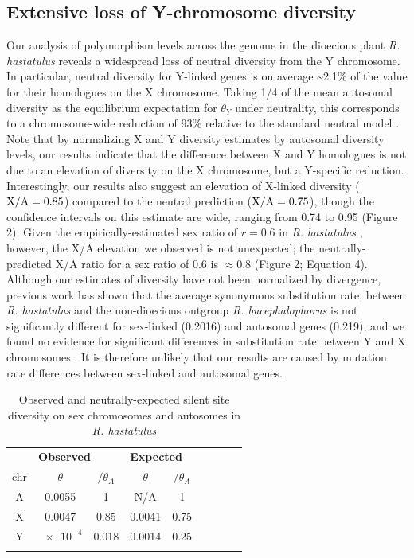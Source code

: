 \documentclass[9pt,twocolumn,twoside]{gsajnl}
\begin{document}
\subsection*{Extensive loss of Y-chromosome diversity}
Our analysis of polymorphism levels across the genome in the dioecious plant \textit{R. hastatulus} reveals a widespread loss of neutral diversity from the Y chromosome. In particular, neutral diversity for Y-linked genes is on average \textasciitilde 2.1\% of the value for their homologues on the X chromosome. Taking 1/4 of the mean autosomal diversity as the equilibrium expectation for $\theta_{Y}$ under neutrality, this corresponds to a chromosome-wide reduction of 93\% relative to the standard neutral model \citep{wright1931evolution}. Note that by normalizing X and Y diversity estimates by autosomal diversity levels, our results indicate that the difference between X and Y homologues is not due to an elevation of diversity on the X chromosome, but a Y-specific reduction. Interestingly, our results also suggest an elevation of X-linked diversity ($\textnormal{X/A}=0.85$) compared to the neutral prediction ($\textnormal{X/A}=0.75$), though the confidence intervals on this estimate are wide, ranging from 0.74 to 0.95 (Figure 2). Given the empirically-estimated sex ratio of $r=0.6$ in \textit{R. hastatulus} \citep{pickup2013influence}, however, the X/A elevation we observed is not unexpected; the neutrally-predicted X/A ratio for a sex ratio of 0.6 is $\approx 0.8$ (Figure 2; Equation 4). Although our estimates of diversity have not been normalized by divergence, previous work has shown that the average synonymous substitution rate, between \textit{R. hastatulus} and the non-dioecious outgroup \textit{R. bucephalophorus} is not significantly different for sex-linked (0.2016) and autosomal genes (0.219), and we found no evidence for significant differences in substitution rate between Y and X chromosomes \citep{hough2014}. It is therefore unlikely that our results are caused by mutation rate differences between sex-linked and autosomal genes.

\begin{table}[htb]
\centering
\caption{Observed and neutrally-expected silent site diversity on sex chromosomes and autosomes in \textit{R. hastatulus}}
\begin{tabular}{ccccccccc}
\textbf{} & \multicolumn{2}{l}{\textbf{Observed}} & \multicolumn{3}{l}{\textbf{Expected}} \\

chr & $\theta$ & $/\theta_{A}$ & $\theta$ & $/\theta_{A}$  \\
\midrule
A & 0.0055 & 1 & N/A & 1 \\
X & 0.0047 & 0.85 & 0.0041 & 0.75 \\
Y & $\num{e-4}$ & 0.018 & 0.0014 & 0.25 \\
\addlinespace

\bottomrule
\end{tabular}
\end{table}
\end{document}
